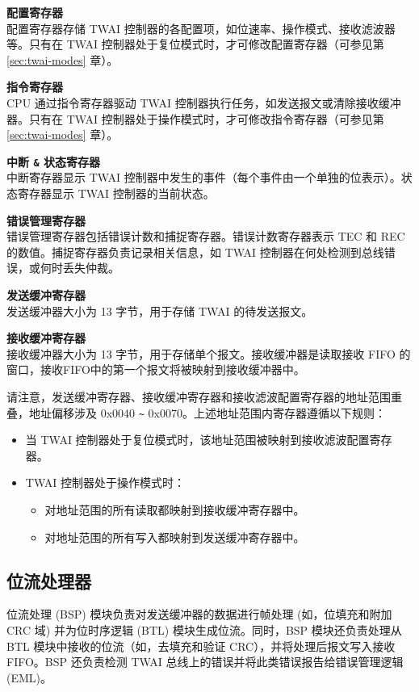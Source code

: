 \documentclass[main\_\_CN.tex]{subfiles}
\begin{document}
{\bfseries 配置寄存器}\\
配置寄存器存储 TWAI 控制器的各配置项，如位速率、操作模式、接收滤波器等。只有在 TWAI 控制器处于复位模式时，才可修改配置寄存器（可参见第 \ref{sec:twai-modes} 章）。

{\bfseries 指令寄存器}\\
CPU 通过指令寄存器驱动 TWAI 控制器执行任务，如发送报文或清除接收缓冲器。只有在 TWAI 控制器处于操作模式时，才可修改指令寄存器（可参见第 \ref{sec:twai-modes} 章）。

{\bfseries 中断 \verb+&+ 状态寄存器}\\
中断寄存器显示 TWAI 控制器中发生的事件（每个事件由一个单独的位表示）。状态寄存器显示 TWAI 控制器的当前状态。

{\bfseries 错误管理寄存器}\\
错误管理寄存器包括错误计数和捕捉寄存器。错误计数寄存器表示 TEC 和 REC 的数值。捕捉寄存器负责记录相关信息，如 TWAI 控制器在何处检测到总线错误，或何时丢失仲裁。

{\bfseries 发送缓冲寄存器}\\
发送缓冲器大小为 13 字节，用于存储 TWAI 的待发送报文。

{\bfseries 接收缓冲寄存器}\\
接收缓冲器大小为 13 字节，用于存储单个报文。接收缓冲器是读取接收 FIFO 的窗口，接收FIFO中的第一个报文将被映射到接收缓冲器中。

请注意，发送缓冲寄存器、接收缓冲寄存器和接收滤波配置寄存器的地址范围重叠，地址偏移涉及 0x0040 \verb+~+ 0x0070。上述地址范围内寄存器遵循以下规则：

\begin{itemize}
    \item 当 TWAI 控制器处于复位模式时，该地址范围被映射到接收滤波配置寄存器。
    \item TWAI 控制器处于操作模式时：
    \begin{itemize}
        \item 对地址范围的所有读取都映射到接收缓冲寄存器中。
        \item 对地址范围的所有写入都映射到发送缓冲寄存器中。
    \end{itemize}
\end{itemize}

\subsection{位流处理器}
位流处理 (BSP) 模块负责对发送缓冲器的数据进行帧处理 (如，位填充和附加 CRC 域) 并为位时序逻辑 (BTL) 模块生成位流。同时，BSP 模块还负责处理从 BTL 模块中接收的位流（如，去填充和验证 CRC），并将处理后报文写入接收 FIFO。BSP 还负责检测 TWAI 总线上的错误并将此类错误报告给错误管理逻辑 (EML)。
\end{document}
